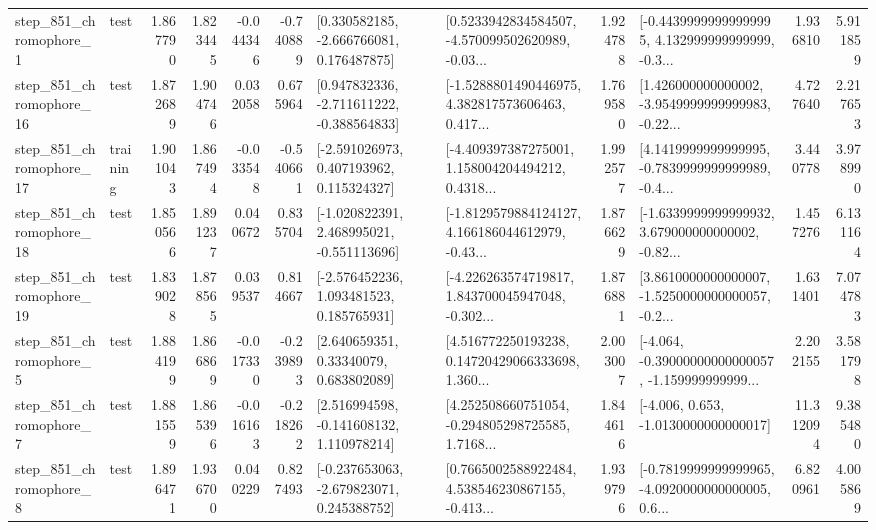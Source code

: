 \begin{tabular}{llrrrrllrlrr}
   step\_851\_chromophore\_1 &      test &      1.867790 &    1.823445 &     -0.044346 & -0.740889 &    [0.330582185, -2.666766081, 0.176487875] &  [0.5233942834584507, -4.570099502620989, -0.03... &       1.924788 &  [-0.44399999999999995, 4.132999999999999, -0.3... &            1.936810 &          5.911859 \\
  step\_851\_chromophore\_16 &      test &      1.872689 &    1.904746 &      0.032058 &  0.675964 &   [0.947832336, -2.711611222, -0.388564833] &  [-1.5288801490446975, 4.382817573606463, 0.417... &       1.769580 &  [1.426000000000002, -3.9549999999999983, -0.22... &            4.727640 &          2.217653 \\
  step\_851\_chromophore\_17 &  training &      1.901043 &    1.867494 &     -0.033548 & -0.540661 &    [-2.591026973, 0.407193962, 0.115324327] &  [-4.409397387275001, 1.158004204494212, 0.4318... &       1.992577 &  [4.1419999999999995, -0.7839999999999989, -0.4... &            3.440778 &          3.978990 \\
  step\_851\_chromophore\_18 &      test &      1.850566 &    1.891237 &      0.040672 &  0.835704 &   [-1.020822391, 2.468995021, -0.551113696] &  [-1.8129579884124127, 4.166186044612979, -0.43... &       1.876629 &  [-1.6339999999999932, 3.679000000000002, -0.82... &            1.457276 &          6.131164 \\
  step\_851\_chromophore\_19 &      test &      1.839028 &    1.878565 &      0.039537 &  0.814667 &    [-2.576452236, 1.093481523, 0.185765931] &  [-4.226263574719817, 1.843700045947048, -0.302... &       1.876881 &  [3.8610000000000007, -1.5250000000000057, -0.2... &            1.631401 &          7.074783 \\
   step\_851\_chromophore\_5 &      test &      1.884199 &    1.866869 &     -0.017330 & -0.239893 &      [2.640659351, 0.33340079, 0.683802089] &  [4.516772250193238, 0.14720429066333698, 1.360... &       2.003007 &  [-4.064, -0.39000000000000057, -1.159999999999... &            2.202155 &          3.581798 \\
   step\_851\_chromophore\_7 &      test &      1.881559 &    1.865396 &     -0.016163 & -0.218262 &    [2.516994598, -0.141608132, 1.110978214] &  [4.252508660751054, -0.294805298725585, 1.7168... &       1.844616 &               [-4.006, 0.653, -1.0130000000000017] &           11.312094 &          9.385480 \\
   step\_851\_chromophore\_8 &      test &      1.896471 &    1.936700 &      0.040229 &  0.827493 &   [-0.237653063, -2.679823071, 0.245388752] &  [0.7665002588922484, 4.538546230867155, -0.413... &       1.939796 &  [-0.7819999999999965, -4.0920000000000005, 0.6... &            6.820961 &          4.005869 \\

\end{tabular}
